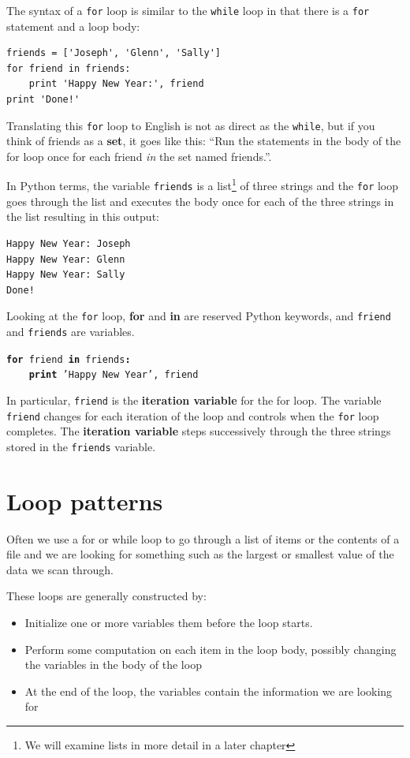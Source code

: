 \documentclass[10pt]{book}
\begin{document}
The syntax of a {\tt for} loop is similar to the {\tt while} loop
in that there is a {\tt for} statement and a loop body:

\beforeverb
\begin{verbatim}
friends = ['Joseph', 'Glenn', 'Sally']
for friend in friends:
    print 'Happy New Year:', friend
print 'Done!'
\end{verbatim}
\afterverb
%
Translating this {\tt for} loop to English is not as direct as the 
{\tt while}, but if you think of friends as a {\bf set},
it goes like this: ``Run the statements in the body of the 
for loop once for each friend {\em in} the set named friends.''.

In Python terms, 
the variable {\tt friends} is a list\footnote{We will 
examine lists in more detail in a later chapter} 
of three strings and the {\tt for}
loop goes through the list and executes the body once
for each of the three strings in the list resulting in this output:

\beforeverb
\begin{verbatim}
Happy New Year: Joseph
Happy New Year: Glenn
Happy New Year: Sally
Done!
\end{verbatim}
\afterverb
%
Looking at the {\tt for} loop, {\bf for} and {\bf in} are reserved
Python keywords, and {\tt friend} and {\tt friends} are variables.

{\tt {\bf for} friend {\bf in} friends{\bf :}\\
\verb"    "{\bf print} 'Happy New Year', friend }

In particular, {\tt friend} is the {\bf iteration variable} for 
the for loop.  The variable {\tt friend} changes for each iteration of
the loop and controls when the {\tt for} loop completes.  The 
{\bf iteration variable} steps successively through the 
three strings stored in the {\tt friends} variable.


\section{Loop patterns}

Often we use a for or while loop to go through a list of items
or the contents of a file and we are looking for something such as
the largest or smallest value of the data we scan through.

These loops are generally constructed by:

\begin{itemize}

\item Initialize one or more variables them before the loop starts.

\item Perform some computation on each item in the loop body, 
possibly changing the variables in the body of the loop

\item At the end of the loop, the variables contain the information
we are looking for

\end{itemize}
\end{document}
